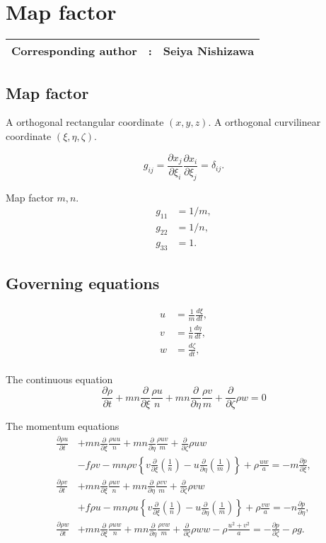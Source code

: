 %

\chapter{Map factor}
\label{chap: map factor}
{\bf \Large 
\begin{tabular}{ccc}
\hline
  Corresponding author & : & Seiya Nishizawa\\
\hline
\end{tabular}
}

\newcommand{\pd}[2]{\frac{\partial #1}{\partial #2}}


\section{Map factor}
A orthogonal rectangular coordinate $(x, y, z)$.
A orthogonal curvilinear coordinate $(\xi, \eta, \zeta)$.

\begin{equation}
  g_{ij} = \pd{x_j}{\xi_i}\pd{x_i}{\xi_j} = \delta_{ij}.
\end{equation}

Map factor $m, n$.
\begin{align}
  g_{11} &= 1/m, \\
  g_{22} &= 1/n,\\
  g_{33} &= 1.
\end{align}

\section{Governing equations}
\begin{align}
  u &= \frac{1}{m}\frac{d \xi}{dt}, \\
  v &= \frac{1}{n}\frac{d \eta}{dt}, \\
  w &= \frac{d \zeta}{dt}, \\
\end{align}

The continuous equation
\begin{equation}
  \pd{\rho}{t} + mn\pd{}{\xi}\frac{\rho u}{n} + mn\pd{}{\eta}\frac{\rho v}{m} + \pd{}{\zeta}\rho w = 0
\end{equation}

The momentum equations
\begin{align}
  \pd{\rho u}{t} &+ mn\pd{}{\xi}\frac{\rho uu}{n} + mn\pd{}{\eta}\frac{\rho uv}{m} + \pd{}{\zeta}\rho uw \\
  &- f\rho v - mn \rho v\left\{v\pd{}{\xi}\left(\frac{1}{n}\right) - u\pd{}{\eta}\left(\frac{1}{m}\right)\right\} + \rho\frac{uw}{a} = -m\pd{p}{\xi}, \\
  \pd{\rho v}{t} &+ mn\pd{}{\xi}\frac{\rho uv}{n} + mn\pd{}{\eta}\frac{\rho vv}{m} + \pd{}{\zeta}\rho vw \\
  &+f\rho u - mn \rho u\left\{v\pd{}{\xi}\left(\frac{1}{n}\right) - u\pd{}{\eta}\left(\frac{1}{m}\right)\right\} + \rho\frac{vw}{a} = -n\pd{p}{\eta}, \\
  \pd{\rho w}{t} &+ mn\pd{}{\xi}\frac{\rho uw}{n} + mn\pd{}{\eta}\frac{\rho vw}{m} + \pd{}{\zeta}\rho ww -\rho \frac{u^2+v^2}{a} = -\pd{p}{\zeta} -\rho g.
\end{align}

